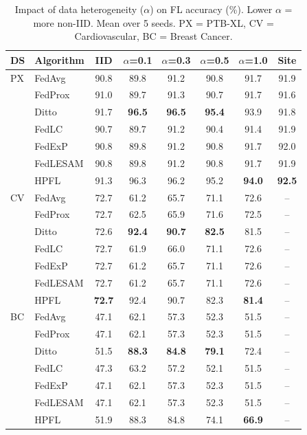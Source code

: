 \documentclass[conference]{IEEEtran}
\begin{document}
\begin{table}[t]
\centering
\caption{Impact of data heterogeneity ($\alpha$) on FL accuracy (\%). Lower $\alpha$ = more non-IID. Mean over 5 seeds. PX = PTB-XL, CV = Cardiovascular, BC = Breast Cancer.}
\label{tab:heterogeneity}
\small
\begin{tabular}{llcccccc}
\toprule
\textbf{DS} & \textbf{Algorithm} & \textbf{IID} & \textbf{$\alpha$=0.1} & \textbf{$\alpha$=0.3} & \textbf{$\alpha$=0.5} & \textbf{$\alpha$=1.0} & \textbf{Site} \\
\midrule
PX & FedAvg & 90.8 & 89.8 & 91.2 & 90.8 & 91.7 & 91.9 \\
 & FedProx & 91.0 & 89.7 & 91.3 & 90.7 & 91.7 & 91.6 \\
 & Ditto & 91.7 & \textbf{96.5} & \textbf{96.5} & \textbf{95.4} & 93.9 & 91.8 \\
 & FedLC & 90.7 & 89.7 & 91.2 & 90.4 & 91.4 & 91.9 \\
 & FedExP & 90.8 & 89.8 & 91.2 & 90.8 & 91.7 & 92.0 \\
 & FedLESAM & 90.8 & 89.8 & 91.2 & 90.8 & 91.7 & 91.9 \\
 & HPFL & 91.3 & 96.3 & 96.2 & 95.2 & \textbf{94.0} & \textbf{92.5} \\
\midrule
CV & FedAvg & 72.7 & 61.2 & 65.7 & 71.1 & 72.6 & -- \\
 & FedProx & 72.7 & 62.5 & 65.9 & 71.6 & 72.5 & -- \\
 & Ditto & 72.6 & \textbf{92.4} & \textbf{90.7} & \textbf{82.5} & 81.5 & -- \\
 & FedLC & 72.7 & 61.9 & 66.0 & 71.1 & 72.6 & -- \\
 & FedExP & 72.7 & 61.2 & 65.7 & 71.1 & 72.6 & -- \\
 & FedLESAM & 72.7 & 61.2 & 65.7 & 71.1 & 72.6 & -- \\
 & HPFL & \textbf{72.7} & 92.4 & 90.7 & 82.3 & \textbf{81.4} & -- \\
\midrule
BC & FedAvg & 47.1 & 62.1 & 57.3 & 52.3 & 51.5 & -- \\
 & FedProx & 47.1 & 62.1 & 57.3 & 52.3 & 51.5 & -- \\
 & Ditto & 51.5 & \textbf{88.3} & \textbf{84.8} & \textbf{79.1} & 72.4 & -- \\
 & FedLC & 47.3 & 63.2 & 57.2 & 52.1 & 51.5 & -- \\
 & FedExP & 47.1 & 62.1 & 57.3 & 52.3 & 51.5 & -- \\
 & FedLESAM & 47.1 & 62.1 & 57.3 & 52.3 & 51.5 & -- \\
 & HPFL & 51.9 & 88.3 & 84.8 & 74.1 & \textbf{66.9} & -- \\
\bottomrule
\end{tabular}
\end{table}
\end{document}

